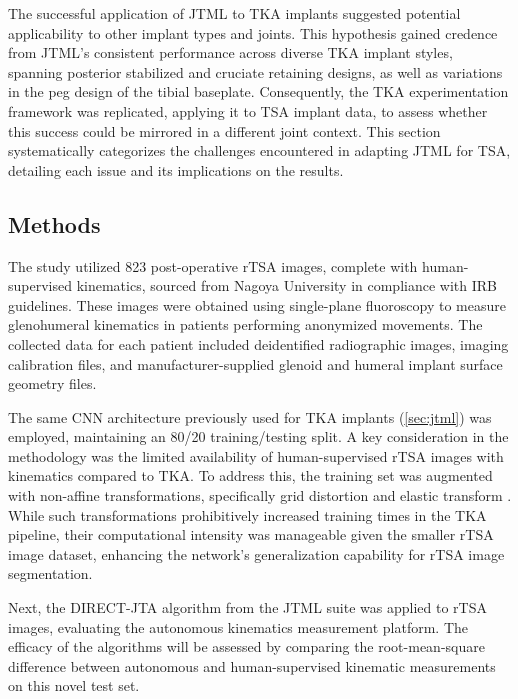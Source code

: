 The successful application of JTML to TKA implants suggested potential applicability to other implant types and joints.
This hypothesis gained credence from JTML's consistent performance across diverse TKA implant styles, spanning posterior stabilized and cruciate retaining designs, as well as variations in the peg design of the tibial baseplate.
Consequently, the TKA experimentation framework was replicated, applying it to TSA implant data, to assess whether this success could be mirrored in a different joint context.
This section systematically categorizes the challenges encountered in adapting JTML for TSA, detailing each issue and its implications on the results.

\subsection{Methods}
The study utilized 823 post-operative rTSA images, complete with human-supervised kinematics, sourced from Nagoya University in compliance with IRB guidelines.
These images were obtained using single-plane fluoroscopy to measure glenohumeral kinematics in patients performing anonymized movements.
The collected data for each patient included deidentified radiographic images, imaging calibration files, and manufacturer-supplied glenoid and humeral implant surface geometry files.


The same CNN architecture previously used for TKA implants \cite{wangDeepHighResolutionRepresentation2020} (\cref{sec:jtml}) was employed, maintaining an 80/20 training/testing split.
A key consideration in the methodology was the limited availability of human-supervised rTSA images with kinematics compared to TKA.
To address this, the training set was augmented with non-affine transformations, specifically grid distortion and elastic transform \cite{buslaevAlbumentationsFastFlexible2020}.
While such transformations prohibitively increased training times in the TKA pipeline, their computational intensity was manageable given the smaller rTSA image dataset, enhancing the network's generalization capability for rTSA image segmentation.

Next, the DIRECT-JTA algorithm from the JTML suite was applied to rTSA images, evaluating the autonomous kinematics measurement platform.
The efficacy of the algorithms will be assessed by comparing the root-mean-square difference between autonomous and human-supervised kinematic measurements on this novel test set.

